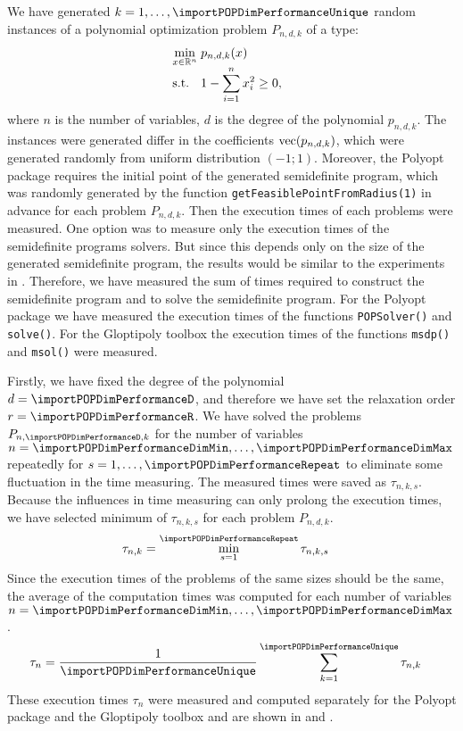 We have generated $k = 1,\ldots,\importPOPDimPerformanceUnique$ random instances of a polynomial optimization problem $P_{n,d,k}$ of a type:
\begin{align}
  \arraycolsep=1.4pt
  \begin{array}{rclrcl@{\hskip0.5cm}l}
    && \displaystyle \min_{x\in\R^n} & \multicolumn{3}{l}{\displaystyle p_{n,d,k}(x)}\\
    && \text{s.t.} & \displaystyle 1 - \sum_{i=1}^n x_i^2 &\geq& 0,
  \end{array}
\end{align}
where $n$ is the number of variables, $d$ is the degree of the polynomial $p_{n,d,k}$.
The instances were generated differ in the coefficients $\operatorname{vec}(p_{n,d,k})$, which were generated randomly from uniform distribution $(-1;1)$.
Moreover, the Polyopt package requires the initial point of the generated semidefinite program, which was randomly generated by the function \texttt{getFeasiblePointFromRadius(1)} in advance for each problem $P_{n,d,k}$.
Then the execution times of each problems were measured.
One option was to measure only the execution times of the semidefinite programs solvers. But since this depends only on the size of the generated semidefinite program, the results would be similar to the experiments in .
Therefore, we have measured the sum of times required to construct the semidefinite program and to solve the semidefinite program.
For the Polyopt package we have measured the execution times of the functions \texttt{POPSolver()} and \texttt{solve()}.
For the Gloptipoly toolbox the execution times of the functions \texttt{msdp()} and \texttt{msol()} were measured.

Firstly, we have fixed the degree of the polynomial $d = \importPOPDimPerformanceD$, and therefore we have set the relaxation order $r = \importPOPDimPerformanceR$.
We have solved the problems $P_{n,\importPOPDimPerformanceD,k}$ for the number of variables $n = \importPOPDimPerformanceDimMin, \ldots, \importPOPDimPerformanceDimMax$ repeatedly for $s = 1,\ldots, \importPOPDimPerformanceRepeat$ to eliminate some fluctuation in the time measuring.
The measured times were saved as $\tau_{n,k,s}$.
Because the influences in time measuring can only prolong the execution times, we have selected minimum of $\tau_{n,k,s}$ for each problem $P_{n,d,k}$.
\begin{align}
  \tau_{n,k} &= \min_{s=1}^{\importPOPDimPerformanceRepeat} \tau_{n,k,s}
\end{align}
Since the execution times of the problems of the same sizes should be the same, the average of the computation times was computed for each number of variables $n = \importPOPDimPerformanceDimMin, \ldots, \importPOPDimPerformanceDimMax$.
\begin{align}
  \tau_n &= \frac{1}{\importPOPDimPerformanceUnique}\sum_{k=1}^{\importPOPDimPerformanceUnique} \tau_{n,k}
\end{align}
These execution times $\tau_n$ were measured and computed separately for the Polyopt package and the Gloptipoly toolbox and are shown in  and .

